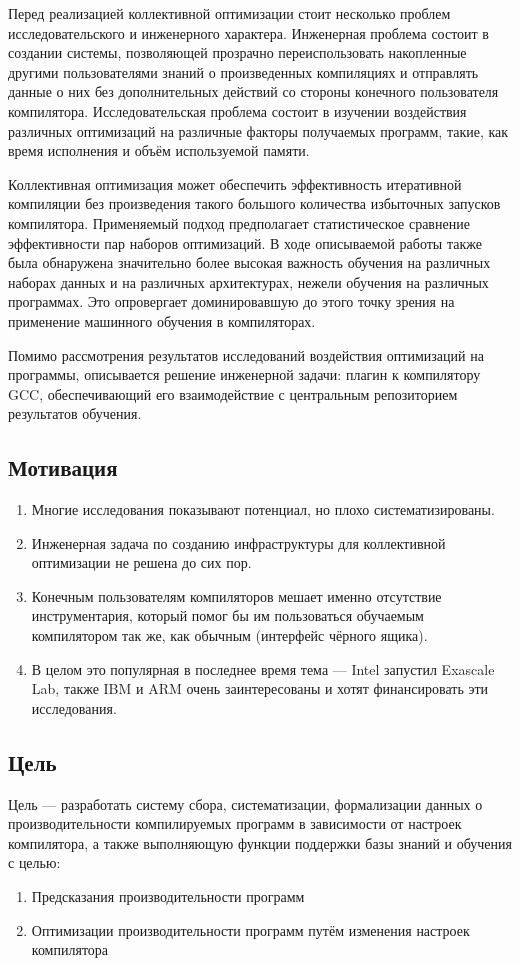 Перед реализацией коллективной оптимизации стоит несколько проблем исследовательского и инженерного характера. Инженерная проблема состоит в создании системы, позволяющей прозрачно переиспользовать накопленные другими пользователями знаний о произведенных компиляциях и отправлять данные о них без дополнительных действий со стороны конечного пользователя компилятора. Исследовательская проблема состоит в изучении воздействия различных оптимизаций на различные факторы получаемых программ, такие, как время исполнения и объём используемой памяти.

Коллективная оптимизация может обеспечить эффективность итеративной компиляции без произведения такого большого количества избыточных запусков компилятора. Применяемый подход предполагает статистическое сравнение эффективности пар наборов оптимизаций. В ходе описываемой работы также была обнаружена значительно более высокая важность обучения на различных наборах данных и на различных архитектурах, нежели обучения на различных программах. Это опровергает доминировавшую до этого точку зрения на применение машинного обучения в компиляторах.

Помимо рассмотрения результатов исследований воздействия оптимизаций на программы, описывается решение инженерной задачи: плагин к компилятору GCC, обеспечивающий его взаимодействие с центральным репозиторием результатов обучения.

\subsection{Мотивация}
\begin{enumerate}
\item Многие исследования показывают потенциал, но плохо систематизированы.
\item Инженерная задача по созданию инфраструктуры для коллективной оптимизации не решена до сих пор.
\item Конечным пользователям компиляторов мешает именно отсутствие инструментария, который помог бы им пользоваться обучаемым компилятором так же, как обычным (интерфейс чёрного ящика).
\item В целом это популярная в последнее время тема --- Intel запустил Exascale Lab, также IBM и ARM очень заинтересованы и хотят финансировать эти исследования.
\end{enumerate}

\subsection{Цель}
Цель — разработать систему сбора, систематизации, формализации данных о производительности компилируемых программ в зависимости от настроек компилятора, а также выполняющую функции поддержки базы знаний и обучения с целью:
\begin{enumerate}
\item Предсказания производительности программ
\item Оптимизации производительности программ путём изменения настроек компилятора
\end{enumerate}

